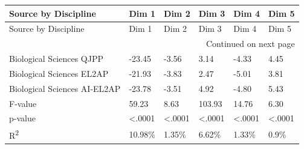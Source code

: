 \begin{longtable}[c]{p{5.5cm}p{1.25cm}p{1.25cm}p{1.25cm}p{1.25cm}p{1.25cm}}
\toprule
Source by Discipline & Dim 1 & Dim 2 & Dim 3 & Dim 4 & Dim 5 \\
\midrule
\endfirsthead
\toprule
Source by Discipline & Dim 1 & Dim 2 & Dim 3 & Dim 4 & Dim 5 \\
\midrule
\endhead
\midrule
\multicolumn{6}{r}{Continued on next page} \\
\midrule
\endfoot
\bottomrule
\endlastfoot
Biological Sciences QJPP & -23.45 & -3.56 & 3.14 & -4.33 & 4.45 \\
Biological Sciences EL2AP & -21.93 & -3.83 & 2.47 & -5.01 & 3.81 \\
Biological Sciences AI-EL2AP & -23.78 & -3.51 & 4.92 & -4.80 & 5.43 \\
\hline
F-value & 59.23 & 8.63 & 103.93 & 14.76 & 6.30 \\
p-value & <.0001 & <.0001 & <.0001 & <.0001 & <.0001 \\
R\textsuperscript{2} & 10.98\% & 1.35\% & 6.62\% & 1.33\% & 0.9\% \\
\end{longtable}
